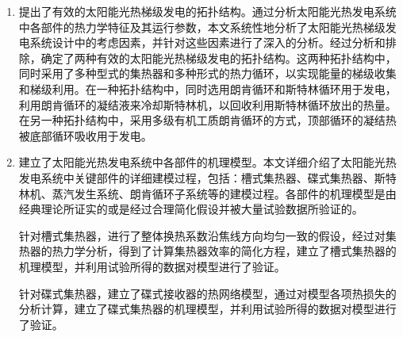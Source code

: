 \begin{enumerate}[label=(\arabic*)]
  \item 提出了有效的太阳能光热梯级发电的拓扑结构。通过分析太阳能光热发电系统中各部件的热力学特征及其运行参数，本文系统性地分析了太阳能光热梯级发电系统设计中的考虑因素，并针对这些因素进行了深入的分析。经过分析和排除，确定了两种有效的太阳能光热梯级发电的拓扑结构。这两种拓扑结构中，同时采用了多种型式的集热器和多种形式的热力循环，以实现能量的梯级收集和梯级利用。在一种拓扑结构中，同时选用朗肯循环和斯特林循环用于发电，利用朗肯循环的凝结液来冷却斯特林机，以回收利用斯特林循环放出的热量。在另一种拓扑结构中，采用多级有机工质朗肯循环的方式，顶部循环的凝结热被底部循环吸收用于发电。
  \item 建立了太阳能光热发电系统中各部件的机理模型。本文详细介绍了太阳能光热发电系统中关键部件的详细建模过程，包括：槽式集热器、碟式集热器、斯特林机、蒸汽发生系统、朗肯循环子系统等的建模过程。各部件的机理模型是由经典理论所证实的或是经过合理简化假设并被大量试验数据所验证的。
  
  针对槽式集热器，进行了整体换热系数沿焦线方向均匀一致的假设，经过对集热器的热力学分析，得到了计算集热器效率的简化方程，建立了槽式集热器的机理模型，并利用试验所得的数据对模型进行了验证。
  
  针对碟式集热器，建立了碟式接收器的热网络模型，通过对模型各项热损失的分析计算，建立了碟式集热器的机理模型，并利用试验所得的数据对模型进行了验证。
  

\end{enumerate}
